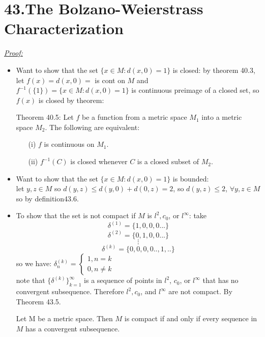 \documentclass{book}
\begin{document}
\section{43.The Bolzano-Weierstrass Characterization}

\begin{tcolorbox}[enhanced,attach boxed title to top center={yshift=-3mm,yshifttext=-1mm},
colback=blue!5!white,colframe=blue!75!black,colbacktitle=red!80!black,
title=Exercise 43.1:,fonttitle=\bfseries,
boxed title style={size=small,colframe=red!50!black} ]
\textit{\color{blue}\underline{Proof:}}
\begin{itemize}
\item Want to show that the set $\{x\in M:d(x,0)=1\}$ is closed: by theorem 40.3, let $f(x)=d(x,0)=$ is cont on 
$M$ and $f^{-1}(\{1\})=\{x\in M:d(x,0)=1\}$
is continuous preimage of a closed set, so $f(x)$ is closed by theorem:
\begin{tcolorbox}[colback=red!5!white,colframe=red!75!black]
Theorem 40.5: Let $f$ be a function from a metric space $M_1$
into a metric space $M_2$.
The following are equivalent:
\begin{enumerate}
\item[(i)] $f$ is continuous on $M_1$.
\item[(ii)] $f^{-1}(C)$ is closed whenever $C$ is a closed subset of $M_2$.
\end{enumerate}
\end{tcolorbox}
\item Want to show that the set $\{x\in M:d(x,0)=1\}$ is bounded:\\
let $y,z\in M$ so $d(y,z)\leq d(y,0)+d(0,z)=2$, so $d(y,z)\leq 2$, $\forall y,z\in M$ so by definition43.6.
\item To show that the set is not compact if $M$ is $l^2,c_0$, or $l^\infty$:
take $$\delta^{(1)}=\{1,0,0,0...\}$$
$$\delta^{(2)}=\{0,1,0,0...\}$$
$$\vdots$$
$$\delta^{(k)}=\{0,0,0,0..,1,..\}$$
so we have: $\delta^{(k)}_n=
\begin{cases} 
1 ,n=k\\
0 ,n\neq k 
\end{cases}$\\
note that $\{\delta^{(k)}\}^{\infty}_{k=1}$ is a sequence of points in $l^2$, $c_0$, or $l^\infty$ that has 
no convergent subsequence.
Therefore $l^2, c_0$, and $l^\infty$ are not compact. By Theorem 43.5.
\begin{tcolorbox}[colback=red!5!white,colframe=red!75!black]
Let M be a metric space. Then $M$ is compact if and only if every sequence in $M$ has a convergent subsequence.
\end{tcolorbox}
\end{itemize}
\end{tcolorbox}
\end{document}
